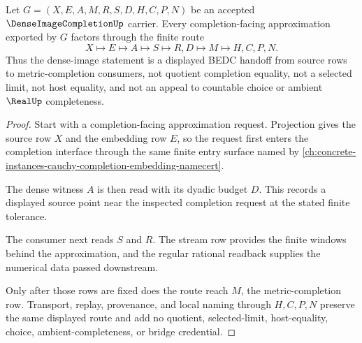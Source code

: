 \begin{theorem}
\label{thm:dense-image-completion-approximation-route}
Let $G=(X,E,A,M,R,S,D,H,C,P,N)$ be an accepted $\DenseImageCompletionUp$ carrier. Every completion-facing approximation exported by $G$ factors through the finite route
$$
X \longmapsto E \longmapsto A \longmapsto S \longmapsto R,D \longmapsto M \longmapsto H,C,P,N .
$$
Thus the dense-image statement is a displayed BEDC handoff from source rows to metric-completion consumers, not quotient completion equality, not a selected limit, not host equality, and not an appeal to countable choice or ambient $\RealUp$ completeness.
\end{theorem}
\begin{proof}
Start with a completion-facing approximation request. Projection gives the source row $X$ and the embedding row $E$, so the request first enters the completion interface through the same finite entry surface named by \autoref{ch:concrete-instances-cauchy-completion-embedding-namecert}.

The dense witness $A$ is then read with its dyadic budget $D$. This records a displayed source point near the inspected completion request at the stated finite tolerance.

The consumer next reads $S$ and $R$. The stream row provides the finite windows behind the approximation, and the regular rational readback supplies the numerical data passed downstream.

Only after those rows are fixed does the route reach $M$, the metric-completion row. Transport, replay, provenance, and local naming through $H,C,P,N$ preserve the same displayed route and add no quotient, selected-limit, host-equality, choice, ambient-completeness, or bridge credential.
\end{proof}

